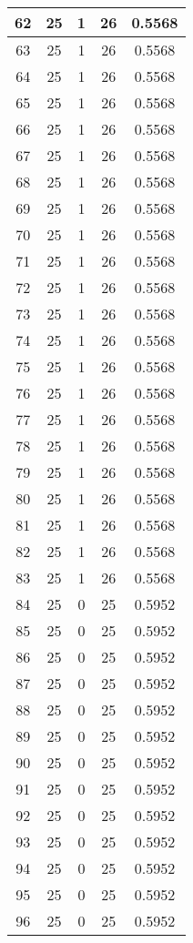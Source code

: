 \documentclass[letterpaper, 12pt]{article}
\begin{document}
\begin{longtable}{|c|c|c|c|c|}
\hline
62 & 25 & 1 & 26 & 0.5568 \\
\hline
63 & 25 & 1 & 26 & 0.5568 \\
\hline
64 & 25 & 1 & 26 & 0.5568 \\
\hline
65 & 25 & 1 & 26 & 0.5568 \\
\hline
66 & 25 & 1 & 26 & 0.5568 \\
\hline
67 & 25 & 1 & 26 & 0.5568 \\
\hline
68 & 25 & 1 & 26 & 0.5568 \\
\hline
69 & 25 & 1 & 26 & 0.5568 \\
\hline
70 & 25 & 1 & 26 & 0.5568 \\
\hline
71 & 25 & 1 & 26 & 0.5568 \\
\hline
72 & 25 & 1 & 26 & 0.5568 \\
\hline
73 & 25 & 1 & 26 & 0.5568 \\
\hline
74 & 25 & 1 & 26 & 0.5568 \\
\hline
75 & 25 & 1 & 26 & 0.5568 \\
\hline
76 & 25 & 1 & 26 & 0.5568 \\
\hline
77 & 25 & 1 & 26 & 0.5568 \\
\hline
78 & 25 & 1 & 26 & 0.5568 \\
\hline
79 & 25 & 1 & 26 & 0.5568 \\
\hline
80 & 25 & 1 & 26 & 0.5568 \\
\hline
81 & 25 & 1 & 26 & 0.5568 \\
\hline
82 & 25 & 1 & 26 & 0.5568 \\
\hline
83 & 25 & 1 & 26 & 0.5568 \\
\hline
84 & 25 & 0 & 25 & 0.5952 \\
\hline
85 & 25 & 0 & 25 & 0.5952 \\
\hline
86 & 25 & 0 & 25 & 0.5952 \\
\hline
87 & 25 & 0 & 25 & 0.5952 \\
\hline
88 & 25 & 0 & 25 & 0.5952 \\
\hline
89 & 25 & 0 & 25 & 0.5952 \\
\hline
90 & 25 & 0 & 25 & 0.5952 \\
\hline
91 & 25 & 0 & 25 & 0.5952 \\
\hline
92 & 25 & 0 & 25 & 0.5952 \\
\hline
93 & 25 & 0 & 25 & 0.5952 \\
\hline
94 & 25 & 0 & 25 & 0.5952 \\
\hline
95 & 25 & 0 & 25 & 0.5952 \\
\hline
96 & 25 & 0 & 25 & 0.5952 \\

\end{longtable}
\end{document}
